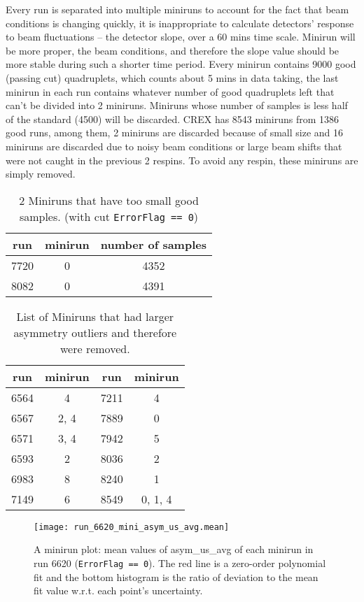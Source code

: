 Every run is separated into multiple miniruns to account for the fact that beam
conditions is changing quickly, it is inappropriate to calculate detectors'
response to beam fluctuations -- the detector slope, over a 60 mins time scale. 
Minirun will be more proper, the beam conditions, and therefore
the slope value should be more stable during such a shorter time period.  
Every minirun contains 9000 good (passing cut) quadruplets, which counts about 5 mins
in data taking, the last minirun in each run contains 
whatever number of good quadruplets left that can't be divided into 2 miniruns. 
Miniruns whose number of samples is less half of the standard (4500) will be discarded.
CREX has 8543 miniruns from 1386 good runs, among them, 2 miniruns are discarded
because of small size and 16 miniruns are discarded due to noisy beam conditions 
or large beam shifts that were not caught in the previous 2 respins.
To avoid any respin, these miniruns are simply removed. %
\begin{table}
    \centering
    \begin{tabular}{c c c}
	\hline
	run & minirun	& number of samples \\
	\hline
	7720	& 0 & 4352  \\
	8082	& 0 & 4391  \\
	\hline
    \end{tabular}
    \caption{2 Miniruns that have too small good samples. (with cut \texttt{ErrorFlag == 0})}
    \label{tab:short_miniruns}
\end{table}
\begin{table}
    \centering
    \begin{tabular}{c c | c c}
	\hline
	run & minirun	& run	& minirun   \\
	\hline
	6564	& 4	& 7211	& 4 \\
	6567	& 2, 4	& 7889	& 0 \\
	6571	& 3, 4	& 7942	& 5 \\
	6593	& 2	& 8036	& 2 \\
	6983	& 8	& 8240	& 1 \\
	7149	& 6	& 8549	& 0, 1, 4   \\
	\hline
    \end{tabular}
    \caption{List of Miniruns that had larger asymmetry outliers and therefore
    were removed.}
\end{table}
\begin{figure}
    \centering
    \texttt{[image: run\_6620\_mini\_asym\_us\_avg.mean]}
    \caption{A minirun plot: mean values of asym\_us\_avg of each minirun in 
    run 6620 (\texttt{ErrorFlag == 0}).
    The red line is a zero-order polynomial fit and the bottom histogram is
    the ratio of deviation to the mean fit value w.r.t. each point's uncertainty.
    }
\end{figure}

